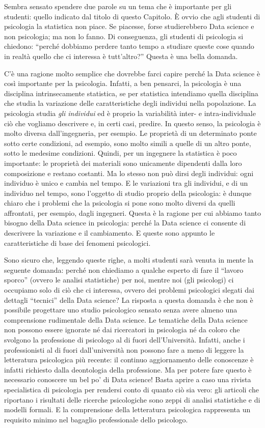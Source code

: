 \documentclass[
  11pt,
]{krantz}
\theoremstyle{definition}
\theoremstyle{definition}
\theoremstyle{definition}
\theoremstyle{definition}
\theoremstyle{remark}
\begin{document}
Sembra sensato spendere due parole su un tema che è importante per gli studenti: quello indicato dal titolo di questo Capitolo. È ovvio che agli studenti di psicologia la statistica non piace. Se piacesse, forse studierebbero Data science e non psicologia; ma non lo fanno. Di conseguenza, gli studenti di psicologia si chiedono: ``perché dobbiamo perdere tanto tempo a studiare queste cose quando in realtà quello che ci interessa è tutt'altro?'' Questa è una bella domanda.

C'è una ragione molto semplice che dovrebbe farci capire perché la Data science è così importante per la psicologia. Infatti, a ben pensarci, la psicologia è una disciplina intrinsecamente statistica, se per statistica intendiamo quella disciplina che studia la variazione delle caratteristiche degli individui nella popolazione. La psicologia studia \emph{gli individui} ed è proprio la variabilità inter- e intra-individuale ciò che vogliamo descrivere e, in certi casi, predire. In questo senso, la psicologia è molto diversa dall'ingegneria, per esempio. Le proprietà di un determinato ponte sotto certe condizioni, ad esempio, sono molto simili a quelle di un altro ponte, sotto le medesime condizioni. Quindi, per un ingegnere la statistica è poco importante: le proprietà dei materiali sono unicamente dipendenti dalla loro composizione e restano costanti. Ma lo stesso non può dirsi degli individui: ogni individuo è unico e cambia nel tempo. E le variazioni tra gli individui, e di un individuo nel tempo, sono l'oggetto di studio proprio della psicologia: è dunque chiaro che i problemi che la psicologia si pone sono molto diversi da quelli affrontati, per esempio, dagli ingegneri. Questa è la ragione per cui abbiamo tanto bisogno della Data science in psicologia: perché la Data science ci consente di descrivere la variazione e il cambiamento. E queste sono appunto le caratteristiche di base dei fenomeni psicologici.

Sono sicuro che, leggendo queste righe, a molti studenti sarà venuta in mente la seguente domanda: perché non chiediamo a qualche esperto di fare il ``lavoro sporco'' (ovvero le analisi statistiche) per noi, mentre noi (gli psicologi) ci occupiamo solo di ciò che ci interessa, ovvero dei problemi psicologici slegati dai dettagli ``tecnici'' della Data science? La risposta a questa domanda è che non è possibile progettare uno studio psicologico sensato senza avere almeno una comprensione rudimentale della Data science. Le tematiche della Data science non possono essere ignorate né dai ricercatori in psicologia né da coloro che svolgono la professione di psicologo al di fuori dell'Università. Infatti, anche i professionisti al di fuori dall'università non possono fare a meno di leggere la letteratura psicologica più recente: il continuo aggiornamento delle conoscenze è infatti richiesto dalla deontologia della professione. Ma per potere fare questo è necessario conoscere un bel po' di Data science! Basta aprire a caso una rivista specialistica di psicologia per rendersi conto di quanto ciò sia vero: gli articoli che riportano i risultati delle ricerche psicologiche sono zeppi di analisi statistiche e di modelli formali. E la comprensione della letteratura psicologica rappresenta un requisito minimo nel bagaglio professionale dello psicologo.
\end{document}
